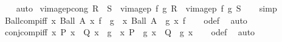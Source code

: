 \begin{isabellebody}
%
\isadelimproof
\ \ %
\endisadelimproof
%
\isatagproof
{}\isamarkupfalse%
\ auto%
\endisatagproof
{\isafoldproof}%
%
\isadelimproof
\isanewline
%
\endisadelimproof
\isanewline
{}\isamarkupfalse%
\ vimage{}p{\isacharunderscore}{\kern0pt}cong{\isacharcolon}{\kern0pt}\ {\isachardoublequoteopen}R\ {\isacharequal}{\kern0pt}\ S\ {\isasymLongrightarrow}\ vimage{}p\ f\ g\ R\ {\isacharequal}{\kern0pt}\ vimage{}p\ f\ g\ S{\isachardoublequoteclose}\isanewline
%
\isadelimproof
\ \ %
\endisadelimproof
%
\isatagproof
{}\isamarkupfalse%
\ simp%
\endisatagproof
{\isafoldproof}%
%
\isadelimproof
\isanewline
%
\endisadelimproof
\isanewline
{}\isamarkupfalse%
\ Ball{\isacharunderscore}{\kern0pt}comp{\isacharunderscore}{\kern0pt}iff{\isacharcolon}{\kern0pt}\ {\isachardoublequoteopen}{\isacharparenleft}{\kern0pt}{\isasymlambda}x{\isachardot}{\kern0pt}\ Ball\ {\isacharparenleft}{\kern0pt}A\ x{\isacharparenright}{\kern0pt}\ f{\isacharparenright}{\kern0pt}\ {\isasymcirc}\ g\ {\isacharequal}{\kern0pt}\ {\isacharparenleft}{\kern0pt}{\isasymlambda}x{\isachardot}{\kern0pt}\ Ball\ {\isacharparenleft}{\kern0pt}{\isacharparenleft}{\kern0pt}A\ {\isasymcirc}\ g{\isacharparenright}{\kern0pt}\ x{\isacharparenright}{\kern0pt}\ f{\isacharparenright}{\kern0pt}{\isachardoublequoteclose}\isanewline
%
\isadelimproof
\ \ %
\endisadelimproof
%
\isatagproof
{}\isamarkupfalse%
\ o{\isacharunderscore}{\kern0pt}def\ \isamarkupfalse%
\ auto%
\endisatagproof
{\isafoldproof}%
%
\isadelimproof
\isanewline
%
\endisadelimproof
\isanewline
{}\isamarkupfalse%
\ conj{\isacharunderscore}{\kern0pt}comp{\isacharunderscore}{\kern0pt}iff{\isacharcolon}{\kern0pt}\ {\isachardoublequoteopen}{\isacharparenleft}{\kern0pt}{\isasymlambda}x{\isachardot}{\kern0pt}\ P\ x\ {\isasymand}\ Q\ x{\isacharparenright}{\kern0pt}\ {\isasymcirc}\ g\ {\isacharequal}{\kern0pt}\ {\isacharparenleft}{\kern0pt}{\isasymlambda}x{\isachardot}{\kern0pt}\ {\isacharparenleft}{\kern0pt}P\ {\isasymcirc}\ g{\isacharparenright}{\kern0pt}\ x\ {\isasymand}\ {\isacharparenleft}{\kern0pt}Q\ {\isasymcirc}\ g{\isacharparenright}{\kern0pt}\ x{\isacharparenright}{\kern0pt}{\isachardoublequoteclose}\isanewline
%
\isadelimproof
\ \ %
\endisadelimproof
%
\isatagproof
{}\isamarkupfalse%
\ o{\isacharunderscore}{\kern0pt}def\ \isamarkupfalse%
\ auto%
\endisatagproof
{\isafoldproof}%
%
\isadelimproof
\isanewline
%
\endisadelimproof
\isanewline
{}\isamarkupfalse%
\isanewline

\end{isabellebody}
